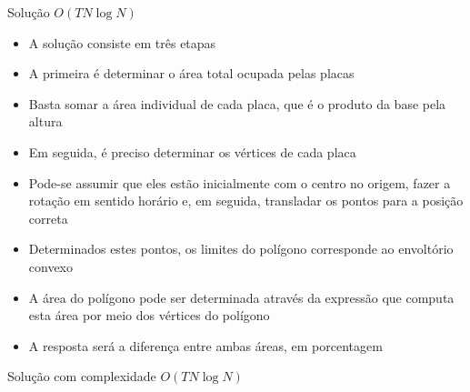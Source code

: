 \begin{frame}[fragile]{Solução $O(TN\log N)$}

    \begin{itemize}
        \item A solução consiste em três etapas

        \item A primeira é determinar o área total ocupada pelas placas

        \item Basta somar a área individual de cada placa, que é o produto da base pela altura

        \item Em seguida, é preciso determinar os vértices de cada placa

        \item Pode-se assumir que eles estão inicialmente com o centro no origem, fazer a 
            rotação em sentido horário e, em seguida, transladar os pontos para a posição
            correta

        \item Determinados estes pontos, os limites do polígono corresponde ao envoltório
            convexo

        \item A área do polígono pode ser determinada através da expressão que computa esta
            área por meio dos vértices do polígono

        \item A resposta será a diferença entre ambas áreas, em porcentagem
    \end{itemize}

\end{frame}

\begin{frame}[fragile]{Solução com complexidade $O(TN\log N)$}
\end{frame}
